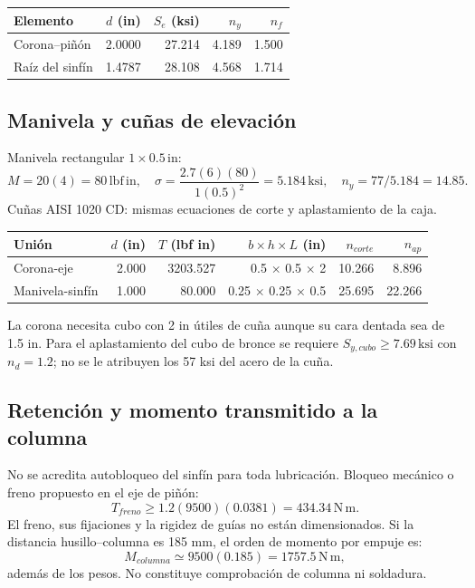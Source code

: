 \documentclass[11pt,a4paper]{article}
\newcommand{\inch}{\,\mathrm{in}}
\newcommand{\lbin}{\,\mathrm{lbf\,in}}
\newcommand{\ksi}{\,\mathrm{ksi}}
\begin{document}
\begin{center}\small\begin{tabular}{lrrrr}\toprule

Elemento & $d$ (in) & $S_e$ (ksi) & $n_y$ & $n_f$ \\ \midrule

Corona--piñón & 2.0000 & 27.214 & 4.189 & 1.500 \\

Raíz del sinfín & 1.4787 & 28.108 & 4.568 & 1.714 \\

\bottomrule\end{tabular}\end{center}

\subsection{Manivela y cuñas de elevación}
Manivela rectangular $1\times0.5\inch$:
\[
M=20(4)=80\lbin,\quad\sigma=\frac{2.7(6)(80)}{1(0.5)^2}=5.184\ksi,
\quad n_y=77/5.184=14.85.
\]
Cuñas AISI 1020 CD: mismas ecuaciones de corte y aplastamiento de la caja.

\begin{center}\small\begin{tabular}{lrrrrr}\toprule

Unión & $d$ (in) & $T$ (lbf in) & $b\times h\times L$ (in) & $n_{corte}$ & $n_{ap}$ \\ \midrule

Corona-eje & 2.000 & 3203.527 & 0.5 $\times$ 0.5 $\times$ 2 & 10.266 & 8.896 \\

Manivela-sinfín & 1.000 & 80.000 & 0.25 $\times$ 0.25 $\times$ 0.5 & 25.695 & 22.266 \\

\bottomrule\end{tabular}\end{center}

La corona necesita cubo con 2 in útiles de cuña aunque su cara dentada sea de 1.5 in. Para el aplastamiento del cubo de bronce se requiere $S_{y,cubo}\geq7.69\ksi$ con $n_d=1.2$; no se le atribuyen los 57 ksi del acero de la cuña.

\subsection{Retención y momento transmitido a la columna}
No se acredita autobloqueo del sinfín para toda lubricación. Bloqueo mecánico o freno propuesto en el eje de piñón:
\[
T_{freno}\geq1.2(9500)(0.0381)=434.34\,\mathrm{N\,m}.
\]
El freno, sus fijaciones y la rigidez de guías no están dimensionados. Si la distancia husillo--columna es 185 mm, el orden de momento por empuje es:
\[
M_{columna}\simeq9500(0.185)=1757.5\,\mathrm{N\,m},
\]
además de los pesos. No constituye comprobación de columna ni soldadura.
\end{document}
